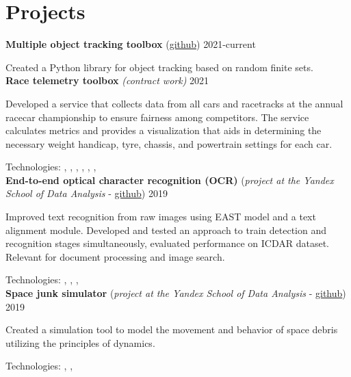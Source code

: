 \section*{\sectionformat Projects}

\textbf{Multiple object tracking toolbox} (\href{https://github.com/neer201/Multi-Object-Tracking-for-Automotive-Systems-in-python}{github}) \hfill 2021-current

Created a Python library for object tracking based on random finite sets.\\
\textbf{Race telemetry toolbox} \textit{(contract work)} \hfill 2021
\par
Developed a service that collects data from all cars and racetracks at the annual racecar championship to ensure fairness among competitors. The service calculates metrics and provides a visualization that aids in determining the necessary weight handicap, tyre, chassis, and powertrain settings for each car.

Technologies: , , , , , , 
\\
\textbf{End-to-end optical character recognition (OCR)} (\textit{project at the Yandex School of Data Analysis} - \href{https://github.com/neer201/end2end_OCR}{github})  \hfill 2019
\par
Improved text recognition from raw images using EAST model and a text alignment module. Developed and tested an approach to train detection and recognition stages simultaneously, evaluated performance on ICDAR dataset. Relevant for document processing and image search.

Technologies: , , , 
% 
\\
\textbf{Space junk simulator} (\textit{project at the Yandex School of Data Analysis} - \href{https://github.com/neer201/space_junk_simulator}{github})   \hfill 2019
\par
Created a simulation tool to model the movement and behavior of space debris utilizing the principles of dynamics.

Technologies: , , 
